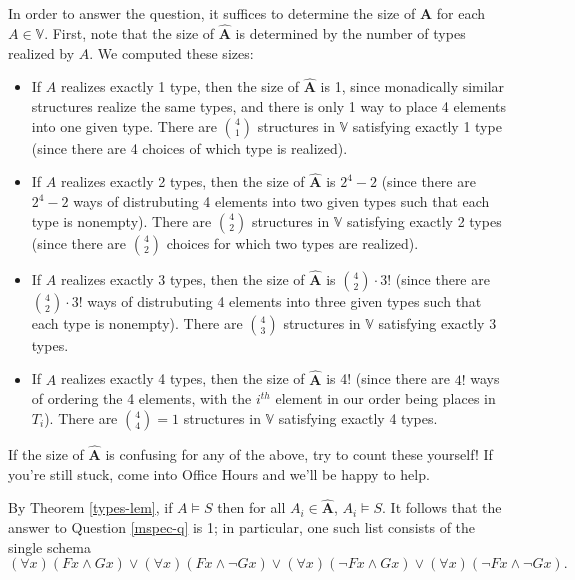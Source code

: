 In order to answer the question, it suffices to determine the size of $\bm\hat{A}$ for each $A\in\mathbb{V}$. First, note that the size of $\bm\hat{A}$ is determined by the number of types realized by $A$. We computed these sizes:
\begin{itemize}
\item
If $A$ realizes exactly 1 type, then the size of $\bm\hat{A}$ is 1, since monadically similar structures realize the same types, and there is only 1 way to place 4 elements into one given type. There are $\binom{4}{1}$ structures in $\mathbb{V}$ satisfying exactly 1 type (since there are 4 choices of which type is realized).
\item
If $A$ realizes exactly 2 types, then the size of $\bm\hat{A}$ is $2^4-2$ (since there are $2^4 - 2$ ways of distrubuting 4 elements into two given types such that each type is nonempty). There are $\binom{4}{2}$ structures in $\mathbb{V}$ satisfying exactly 2 types (since there are $\binom{4}{2}$ choices for which two types are realized).
\item
If $A$ realizes exactly 3 types, then the size of $\bm\hat{A}$ is $\binom{4}{2}\cdot3!$ (since there are $\binom{4}{2}\cdot3!$ ways of distrubuting 4 elements into three given types such that each type is nonempty). There are $\binom{4}{3}$ structures in $\mathbb{V}$ satisfying exactly 3 types.
\item
If $A$ realizes exactly 4 types, then the size of $\bm\hat{A}$ is 4! (since there are $4!$ ways of ordering the 4 elements, with the $i^{th}$ element in our order being places in $T_i$). There are $\binom{4}{4} = 1$ structures in $\mathbb{V}$ satisfying exactly 4 types.
\end{itemize}
\begin{aside}
    If the size of $\bm\hat{A}$ is confusing for any of the above, try to count these yourself! If you're still stuck, come into Office Hours and we'll be happy to help. 
\end{aside}

By Theorem \ref{types-lem}, if $A \models S$ then for all $A_i \in \bm\hat{A}$, $A_i \models S$. It follows that the answer to Question \ref{mspec-q} is 1; in particular, one such list consists of the single schema
\[(\forall x)(Fx\wedge Gx)\vee(\forall x)(Fx\wedge \neg Gx)\vee(\forall x)(\neg Fx\wedge Gx)\vee(\forall x)(\neg Fx\wedge \neg Gx).\]

